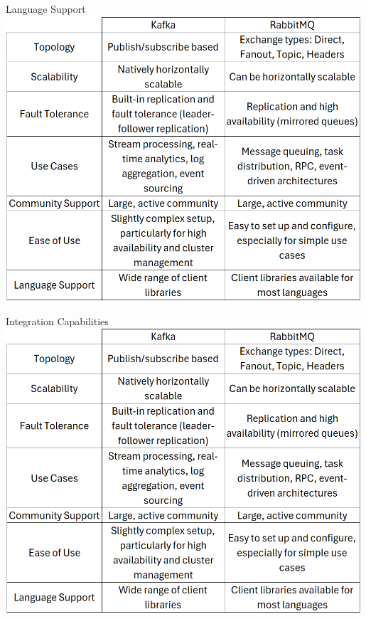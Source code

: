 \documentclass{beamer}
\begin{document}
\begin{frame}{Language Support}
  \includegraphics[width=0.99\textwidth]{fig/vs2.png}
\end{frame}

\begin{frame}{Integration Capabilities}
  \includegraphics[width=0.99\textwidth]{fig/vs2.png}
\end{frame}
\end{document}
